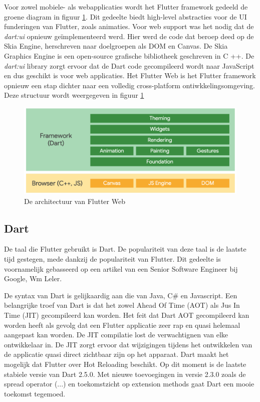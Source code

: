 Voor zowel mobiele- als webapplicaties wordt het Flutter framework gedeeld de groene diagram in figuur \ref{fig:flutter-web-architecture}. Dit gedeelte biedt high-level abstracties voor de UI funderingen van Flutter, zoals animaties. Voor web support was het nodig dat de \emph{dart:ui} opnieuw geïmplementeerd werd. Hier werd de code dat beroep deed op de Skia Engine, herschreven naar doelgroepen als DOM en Canvas. De Skia Graphics Engine is een open-source grafische bibliotheek geschreven in C ++. De \emph{dart:ui} library zorgt ervoor dat de Dart code gecompileerd wordt naar JavaScript en dus geschikt is voor web applicaties. 
\newline
Het Flutter Web is het Flutter framework opnieuw een stap dichter naar een volledig cross-platform ontiwkkelingsomgeving.
Deze structuur wordt weergegeven in figuur \ref{fig:flutter-web-architecture}
\begin{figure}[H]
    \includegraphics[width=\linewidth]{img/stand-van-zaken/flutter-web-architecture.png}
    \caption{De architectuur van Flutter Web}
    \label{fig:flutter-web-architecture}
\end{figure}


\subsection{Dart}
De taal die Flutter gebruikt is Dart. De populariteit van deze taal is de laatste tijd gestegen, mede dankzij de populariteit van Flutter.
Dit gedeelte is voornamelijk gebasseerd op een artikel van een Senior Software Engineer bij Google, Wm Leler.

De syntax van Dart is gelijkaardig aan die van Java, C\# en Javascript.
Een belangrijke troef van Dart is dat het zowel Ahead Of Time (AOT) als Jus In Time (JIT) gecompileerd kan worden. Het feit dat Dart AOT gecompileerd kan worden heeft als gevolg dat een Flutter applicatie zeer rap en quasi helemaal aangepast kan worden.
De JIT compilatie lost de verwachtignen van elke ontwikkelaar in. De JIT zorgt ervoor dat wijzigingen tijdens het ontwikkelen van de applicatie quasi direct zichtbaar zijn op het apparaat. Dart maakt het mogelijk dat Flutter over Hot Reloading beschikt. \autocite{Leler2017a}
\newline
Op dit moment is de laatste stabiele versie van Dart 2.5.0. Met nieuwe toevoegingen in versie 2.3.0 zoals de spread operator (...) en toekomstzicht op extension methods gaat Dart een mooie toekomst tegemoed. \autocite{Thomsen2019}


